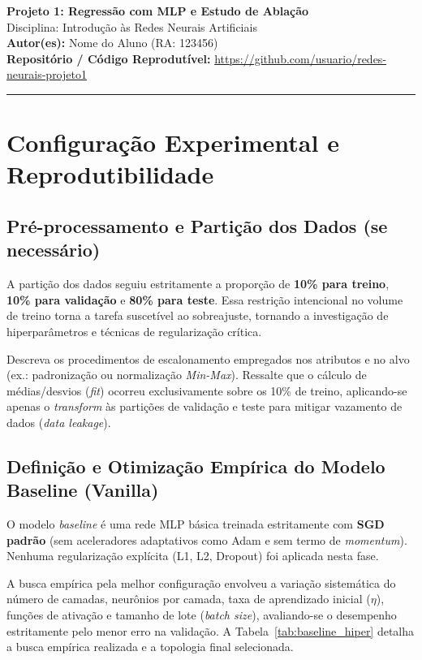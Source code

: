 \documentclass[11pt,a4paper]{article}
\begin{document}
\begin{center}
    {\LARGE \textbf{Projeto 1: Regressão com MLP e Estudo de Ablação}} \\[0.35em]
    {\large Disciplina: Introdução às Redes Neurais Artificiais} \\[0.3em]
    \textbf{Autor(es):} Nome do Aluno (RA: 123456) \\[0.2em]
    \textbf{Repositório / Código Reprodutível:} \url{https://github.com/usuario/redes-neurais-projeto1}
\end{center}
\vspace{-0.5em}
\hrule
\vspace{0.8em}

\section{Configuração Experimental e Reprodutibilidade}

\subsection{Pré-processamento e Partição dos Dados (se necessário)}
A partição dos dados seguiu estritamente a proporção de \textbf{10\% para treino}, \textbf{10\% para validação} e \textbf{80\% para teste}. Essa restrição intencional no volume de treino torna a tarefa suscetível ao sobreajuste, tornando a investigação de hiperparâmetros e técnicas de regularização crítica.

Descreva os procedimentos de escalonamento empregados nos atributos e no alvo (ex.: padronização ou normalização \textit{Min-Max}). Ressalte que o cálculo de médias/desvios (\textit{fit}) ocorreu exclusivamente sobre os 10\% de treino, aplicando-se apenas o \textit{transform} às partições de validação e teste para mitigar vazamento de dados (\textit{data leakage}).

\subsection{Definição e Otimização Empírica do Modelo Baseline (Vanilla)}
O modelo \textit{baseline} é uma rede MLP básica treinada estritamente com \textbf{SGD padrão} (sem aceleradores adaptativos como Adam e sem termo de \textit{momentum}). Nenhuma regularização explícita (L1, L2, Dropout) foi aplicada nesta fase.

A busca empírica pela melhor configuração envolveu a variação sistemática do número de camadas, neurônios por camada, taxa de aprendizado inicial ($\eta$), funções de ativação e tamanho de lote (\textit{batch size}), avaliando-se o desempenho estritamente pelo menor erro na validação. A Tabela~\ref{tab:baseline_hiper} detalha a busca empírica realizada e a topologia final selecionada.
\end{document}

